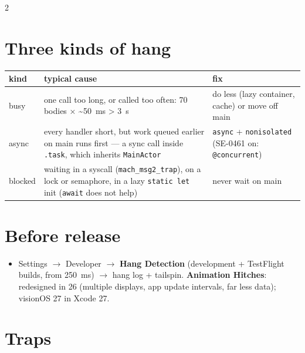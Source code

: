 \documentclass[8pt]{extarticle}
\begin{document}
\begin{multicols}{2}
\section{Three kinds of hang}
{\footnotesize\setlength{\tabcolsep}{3pt}
\begin{tabular}{@{}>{\raggedright\arraybackslash}p{0.95cm}>{\raggedright\arraybackslash}p{4.3cm}>{\raggedright\arraybackslash}p{2.3cm}@{}}
\toprule
\textbf{kind} & \textbf{typical cause} & \textbf{fix} \\
\midrule
busy & one call too long, or called too often: 70 bodies × \textasciitilde50~ms > 3~s & do less
(lazy container, cache) or move off main \\
async & every handler short, but work queued earlier on main runs first — a sync call inside
\texttt{.task}, which inherits \texttt{MainActor} & \texttt{async} + \texttt{nonisolated}
(SE-0461 on: \texttt{@concurrent}) \\
blocked & waiting in a syscall (\texttt{mach\_msg2\_trap}), on a lock or semaphore, in a lazy
\texttt{static let} init (\texttt{await} does not help) & never wait on main \\
\bottomrule
\end{tabular}}

\section{Before release}
\begin{itemize}
  \item Settings $\to$ Developer $\to$ \textbf{Hang Detection} (development + TestFlight builds,
        from 250~ms) $\to$ hang log + tailspin. \textbf{Animation Hitches}: redesigned in 26
        (multiple displays, app update intervals, far less data); visionOS 27 in Xcode 27.
\end{itemize}

\section{Traps}
\begin{itemize}
\end{itemize}

\end{multicols}

\end{document}
